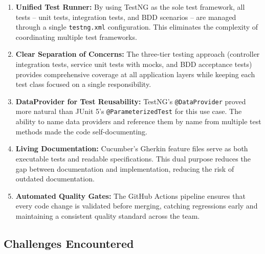 \documentclass[12pt,a4paper]{article}
\begin{document}
\begin{enumerate}
    \item \textbf{Unified Test Runner:} By using TestNG as the sole test framework, all tests -- unit tests, integration tests, and BDD scenarios -- are managed through a single \texttt{testng.xml} configuration. This eliminates the complexity of coordinating multiple test frameworks.

    \item \textbf{Clear Separation of Concerns:} The three-tier testing approach (controller integration tests, service unit tests with mocks, and BDD acceptance tests) provides comprehensive coverage at all application layers while keeping each test class focused on a single responsibility.

    \item \textbf{DataProvider for Test Reusability:} TestNG's \texttt{@DataProvider} proved more natural than JUnit 5's \texttt{@ParameterizedTest} for this use case. The ability to name data providers and reference them by name from multiple test methods made the code self-documenting.

    \item \textbf{Living Documentation:} Cucumber's Gherkin feature files serve as both executable tests and readable specifications. This dual purpose reduces the gap between documentation and implementation, reducing the risk of outdated documentation.

    \item \textbf{Automated Quality Gates:} The GitHub Actions pipeline ensures that every code change is validated before merging, catching regressions early and maintaining a consistent quality standard across the team.
\end{enumerate}

\subsection{Challenges Encountered}
\end{document}

